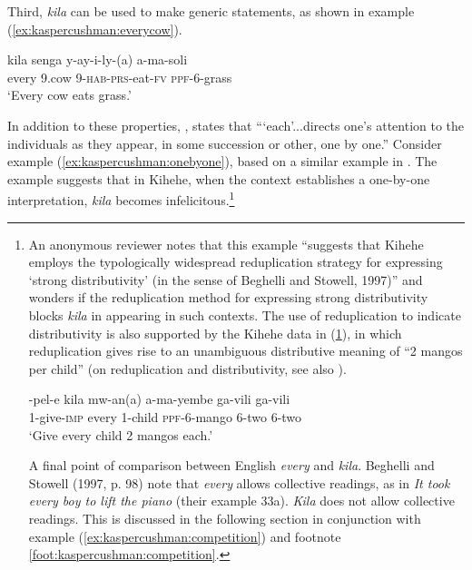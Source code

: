\documentclass[output=paper,modfonts,nonflat]{langsci/langscibook}
\begin{document}
Third, \emph{kila} can be used to make generic statements, as shown in example (\ref{ex:kaspercushman:everycow}).

\begin{exe}


\ex 
\gll kila senga y-ay-i-ly-(a) a-ma-soli \label{ex:kaspercushman:everycow}\\
every 9.cow 9-\textsc{hab}-\textsc{prs}-eat-\textsc{fv} \textsc{ppf}-6-grass \\
\glt `Every cow eats grass.' 

\end{exe}


In addition to these properties, \citealt[150]{vendler62}, states that ```each'...directs one's attention to the individuals as they appear, in some succession or other, one by one.''  Consider example (\ref{ex:kaspercushman:onebyone}), based on a similar example in \citealt[150]{vendler62}. The example suggests that in Kihehe, when the context establishes a one-by-one interpretation, \textit{kila} becomes infelicitous.\footnote{An anonymous reviewer notes that this example ``suggests that Kihehe employs the typologically widespread reduplication strategy for expressing `strong distributivity' (in the sense of Beghelli and Stowell, 1997)'' and wonders if the reduplication method for expressing strong distributivity blocks \textit{kila} in appearing in such contexts. The use of reduplication to indicate distributivity is also supported by the Kihehe data in (\ref{mangos}), in which reduplication gives rise to an unambiguous distributive meaning of ``2 mangos per child'' (on reduplication and distributivity, see also \citealt{balusu13}). 
\begin{exe}
\ex \label{mangos} 
\gll {}-pel-e kila mw-an(a) a-ma-yembe ga-vili ga-vili \\
1-give-\textsc{imp} every 1-child \textsc{ppf}-6-mango 6-two 6-two \\
\glt `Give every child 2 mangos each.' \\
\end{exe}

A final point of comparison between English \textit{every} and \textit{kila}. Beghelli and Stowell (1997, p. 98) note that \textit{every} allows collective readings, as in \textit{It took every boy to lift the piano} (their example 33a). \textit{Kila} does not allow collective readings. This is discussed in the following section in conjunction with example (\ref{ex:kaspercushman:competition}) and footnote \ref{foot:kaspercushman:competition}.}
\end{document}
